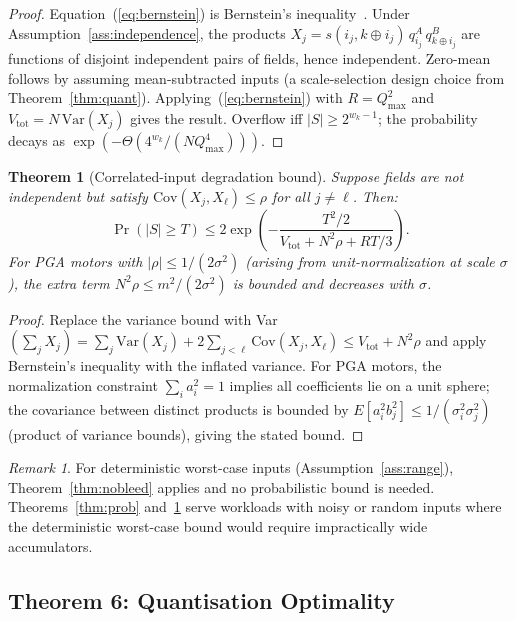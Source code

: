 \documentclass[11pt,a4paper]{article}
\theoremstyle{definition}
\theoremstyle{plain}
\newtheorem{theorem}{Theorem}[section]
\theoremstyle{remark}
\newtheorem{remark}{Remark}[section]
\newcommand{\Var}{\mathrm{Var}}
\newcommand{\Cov}{\mathrm{Cov}}
\begin{document}
\begin{proof}
Equation~(\ref{eq:bernstein}) is Bernstein's inequality~\cite{boucheron2013}.
Under Assumption~\ref{ass:independence}, the products
$X_j = s(i_j,k\oplus i_j)\,q_{i_j}^A\,q_{k\oplus i_j}^B$ are functions
of disjoint independent pairs of fields, hence independent.
Zero-mean follows by assuming mean-subtracted inputs (a scale-selection
design choice from Theorem~\ref{thm:quant}).
Applying~(\ref{eq:bernstein}) with $R = Q_{\max}^2$ and
$V_{\mathrm{tot}} = N\,\Var(X_j)$ gives the result.
Overflow iff $|S| \ge 2^{w_k-1}$; the probability decays as
$\exp(-\Theta(4^{w_k}/(NQ_{\max}^4)))$.
\end{proof}

\begin{theorem}[Correlated-input degradation bound]
\label{thm:corr}
Suppose fields are not independent but satisfy
$\Cov(X_j, X_\ell) \le \rho$ for all $j \ne \ell$.
Then:
\begin{equation}\label{eq:bernstein-corr}
  \Pr(|S| \ge T) \le 2\exp\!\left(
    -\frac{T^2/2}{V_{\mathrm{tot}} + N^2\rho + RT/3}\right).
\end{equation}
For PGA motors with $|\rho| \le 1/(2\sigma^2)$ (arising from
unit-normalization at scale $\sigma$), the extra term
$N^2\rho \le m^2/(2\sigma^2)$ is bounded and decreases with $\sigma$.
\end{theorem}
\begin{proof}
Replace the variance bound with Var$(\sum_j X_j) = \sum_j \Var(X_j) +
2\sum_{j<\ell}\Cov(X_j,X_\ell) \le V_{\mathrm{tot}} + N^2\rho$ and apply
Bernstein's inequality with the inflated variance.
For PGA motors, the normalization constraint
$\sum_i a_i^2 = 1$ implies all coefficients lie on a unit sphere;
the covariance between distinct products is bounded by
$E[a_i^2 b_j^2] \le 1/(\sigma_i^2 \sigma_j^2)$ (product of variance bounds), giving the stated bound.
\end{proof}

\begin{remark}
For deterministic worst-case inputs (Assumption~\ref{ass:range}),
Theorem~\ref{thm:nobleed} applies and no probabilistic bound is needed.
Theorems~\ref{thm:prob} and~\ref{thm:corr} serve workloads with noisy
or random inputs where the deterministic worst-case bound would require
impractically wide accumulators.
\end{remark}

\subsection{Theorem 6: Quantisation Optimality}
\label{sec:quant}
\end{document}
